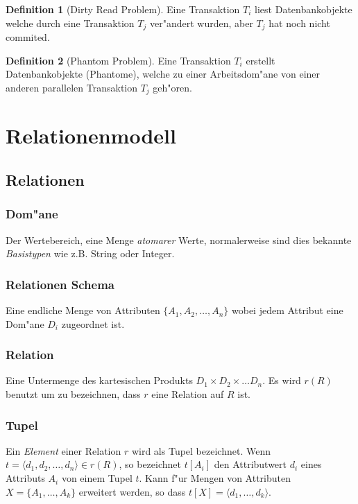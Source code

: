 \documentclass[german, 10pt, a4paper, twocolumn]{scrartcl}
\theoremstyle{definition}
\newtheorem{definition}{Definition}
\theoremstyle{remark}
\theoremstyle{example}
\begin{document}
\begin{definition}[Dirty Read Problem]
	Eine Transaktion $T_i$ liest Datenbankobjekte welche durch eine Transaktion $T_j$ ver"andert wurden, aber $T_j$ hat noch nicht commited.
\end{definition}

\begin{definition}[Phantom Problem]
	Eine Transaktion $T_i$ erstellt Datenbankobjekte (Phantome), welche zu einer Arbeitsdom"ane von einer anderen parallelen Transaktion $T_j$ geh"oren.
\end{definition}


\section{Relationenmodell}

\subsection{Relationen}

\subsubsection{Dom"ane}

Der Wertebereich, eine Menge \textit{atomarer} Werte, normalerweise sind dies bekannte \textit{Basistypen} wie z.B. String oder Integer.


\subsubsection{Relationen Schema}

Eine endliche Menge von Attributen $\{ A_1,A_2,\ldots,A_n\}$ wobei jedem Attribut eine Dom"ane $D_i$ zugeordnet ist.


\subsubsection{Relation}

Eine Untermenge des kartesischen Produkts $D_1\times D_2\times \ldots D_n$. Es wird $r(R)$ benutzt um zu bezeichnen, dass $r$ eine Relation auf $R$ ist.


\subsubsection{Tupel}

Ein \textit{Element} einer Relation $r$ wird als Tupel bezeichnet. Wenn $t=\langle d_1, d_2,\ldots,d_n\rangle \in r(R)$, so bezeichnet $t[A_i]$ den Attributwert $d_i$ eines Attributs $A_i$ von einem Tupel $t$. Kann f"ur Mengen von Attributen $X=\{A_1,\ldots,A_k\}$ erweitert werden, so dass $t[X] = \langle d_1,\ldots, d_k\rangle$.
\end{document}
